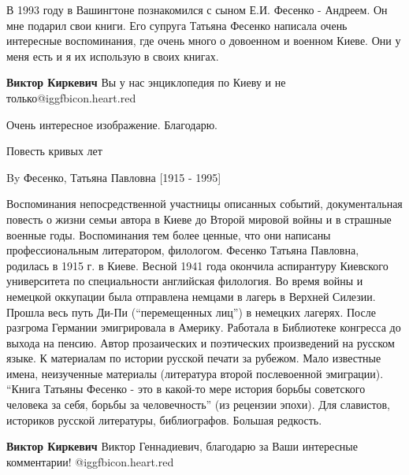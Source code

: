  
 
 
 
 
\zzSecCmt

\begin{itemize} %

В 1993 году в Вашингтоне познакомился с сыном Е.И. Фесенко - Андреем. Он мне
подарил свои книги. Его супруга Татьяна Фесенко написала очень интересные
воспоминания, где очень много о довоенном и военном Киеве. Они у меня есть и я
их использую в своих книгах.

\textbf{Виктор Киркевич} Вы у нас энциклопедия по Киеву и не только@igg{fbicon.heart.red}

Очень интересное изображение. Благодарю.

Повесть кривых лет

By Фесенко, Татьяна Павловна [1915 - 1995]

Воспоминания непосредственной участницы описанных событий, документальная
повесть о жизни семьи автора в Киеве до Второй мировой войны и в страшные
военные годы. Воспоминания тем более ценные, что они написаны профессиональным
литератором, филологом. Фесенко Татьяна Павловна, родилась в 1915 г. в Киеве.
Весной 1941 года окончила аспирантуру Киевского университета по специальности
английская филология. Во время войны и немецкой оккупации была отправлена
немцами в лагерь в Верхней Силезии. Прошла весь путь Ди-Пи (\enquote{перемещенных лиц})
в немецких лагерях. После разгрома Германии эмигрировала в Америку. Работала в
Библиотеке конгресса до выхода на пенсию. Автор прозаических и поэтических
произведений на русском языке. К материалам по истории русской печати за
рубежом. Мало известные имена, неизученные материалы (литература второй
послевоенной эмиграции). \enquote{Книга Татьяны Фесенко - это в какой-то мере история
борьбы советского человека за себя, борьбы за человечность} (из рецензии
эпохи). Для славистов, историков русской литературы, библиографов. Большая
редкость.

\begin{itemize} %
\textbf{Виктор Киркевич} Виктор Геннадиевич, благодарю за Ваши интересные комментарии! @igg{fbicon.heart.red}


\end{itemize}
\end{itemize}
